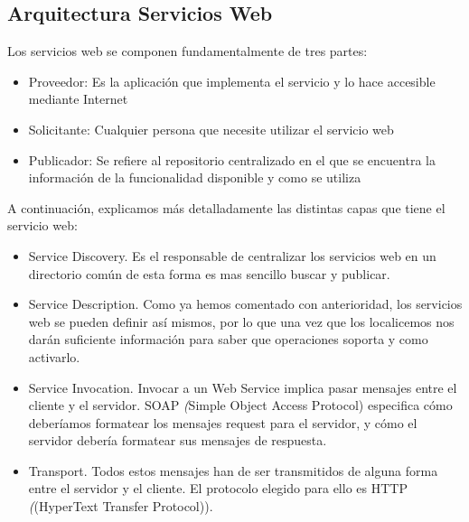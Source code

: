 \subsection{Arquitectura Servicios Web}
\label{cap:subsec:arquitecturaserviciosweb}
Los servicios web se componen fundamentalmente de tres partes:
\begin{itemize}
	\item Proveedor: Es la aplicación que implementa el servicio y lo hace accesible mediante Internet
	\item Solicitante: Cualquier persona que necesite utilizar el servicio web
	\item Publicador: Se refiere al repositorio centralizado en el que se encuentra la información de la funcionalidad disponible y como se utiliza
	
\end{itemize}
 A continuación,
explicamos más detalladamente las distintas capas que tiene el servicio web:
\begin{itemize}
 \item Service Discovery. Es el responsable de centralizar los servicios web en un directorio común de esta forma es mas sencillo buscar y publicar.
 \item Service Description. Como ya hemos comentado con anterioridad, los servicios web se pueden definir así mismos, por lo que una vez que los localicemos nos darán suficiente información para saber que operaciones soporta y como activarlo.
 \item Service Invocation. Invocar a un Web Service implica pasar mensajes entre el cliente y el servidor. SOAP  \textit({Simple Object Access Protocol}) especifica cómo deberíamos formatear los mensajes request para el servidor, y cómo el servidor debería formatear sus mensajes de respuesta.
 \item Transport. Todos estos mensajes han de ser transmitidos de alguna forma entre el servidor y el cliente. El protocolo elegido para ello es HTTP  \textit({(HyperText Transfer Protocol)}). 
\end{itemize}

